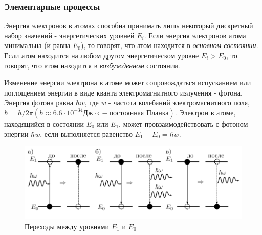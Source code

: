 \documentclass[a4paper,12pt]{article}
\begin{document}
\subsubsection{Элементарные процессы}

Энергия электронов в атомах способна принимать лишь некоторый дискретный набор значений - энергетических уровней $E_i$. Если энергия электронов атома минимальна (и равна $E_0$), то говорят, что атом находится в \textit{основном состоянии}. Если атом находится на любом другом энергетическом уровне $E_i > E_0$, то говорят, что атом находится в \textit{возбужденном} состоянии. 

Изменение энергии электрона в атоме может сопровождаться испусканием или поглощением энергии в виде кванта электромагнитного излучения - фотона. Энергия фотона равна $\hbar w$, где $w$ - частота колебаний электромагнитного поля, $\hbar = h/2\pi (h\approx 6.6\cdot10^{-34}\text{Дж}\cdot\text{с} - \text{постоянная Планка})$. Электрон в атоме, находящийся в состоянии $E_0$ или $E_1$, может провзаимодействовать с фотоном энергии $\hbar w$, если выполняется равенство $E_1-E_0=\hbar w$.

\begin{figure}[h]
\centering
\includegraphics[width=0.6\linewidth]{img5.png}
\caption{Переходы между уровнями $E_1$ и $E_0$}
\label{img5}
\end{figure}
\end{document}
